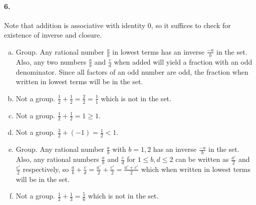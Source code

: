 \documentclass{article}
\begin{document}
\paragraph{6.} Note that addition is associative with identity 0, so it suffices
to check for existence of inverse and closure.
\begin{enumerate}[(a)]
  \item Group. Any rational number $\frac{a}{b}$ in lowest terms has an inverse
    $\frac{-a}{b}$ in the set. Also, any two numbers $\frac{a}{b}$ and
    $\frac{c}{d}$ when added will yield a fraction with an odd denominator.
    Since all factors of an odd number are odd, the fraction when written in
    lowest terms will be in the set.
  \item Not a group. $\frac{1}{2} + \frac{1}{2} = \frac{2}{2} = \frac{1}{1}$
    which is not in the set.
  \item Not a group. $\frac{1}{2} + \frac{1}{2} = 1 \geq 1$.
  \item Not a group. $\frac{3}{2} + (-1) = \frac{1}{2} < 1$.
  \item Group. Any rational number $\frac{a}{b}$ with $b = 1, 2$ has an inverse
    $\frac{-a}{b}$ in the set. Also, any rational numbers $\frac{a}{b}$ and
    $\frac{c}{d}$ for $1 \leq b, d \leq 2$ can be written as $\frac{a'}{2}$ and
    $\frac{c'}{2}$ respectively, so $\frac{a}{b} + \frac{c}{d} = \frac{a'}{2} +
    \frac{c'}{2} = \frac{a' + c'}{2}$ which when written in lowest terms will be
    in the set.
  \item Not a group. $\frac{1}{2} + \frac{1}{3} = \frac{5}{6}$ which is not in
    the set.
\end{enumerate}
\end{document}
